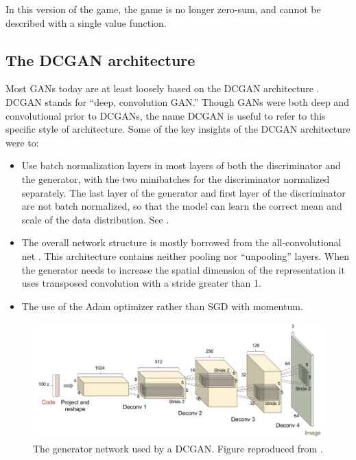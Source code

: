 In this version of the game, the game is no longer zero-sum, and cannot be described with a single
value function.

\subsection{The DCGAN architecture}

Most GANs today are at least loosely based on the DCGAN architecture \citep{radford2015unsupervised}.
DCGAN stands for ``deep, convolution GAN.'' Though GANs were both deep and convolutional prior to
DCGANs, the name DCGAN is useful to refer to this specific style of architecture.
Some of the key insights of the DCGAN architecture were to:
\begin{itemize}
  \item Use batch normalization layers in most layers of both the discriminator and the generator,
        with the two minibatches for the discriminator normalized separately.
        The last layer of the generator and first layer of the discriminator are not batch normalized,
        so that the model can learn the correct mean and scale of the data distribution.
        See .
  \item The overall network structure is mostly borrowed from the all-convolutional net \citep{Springenberg2015}.
        This architecture contains neither pooling nor ``unpooling'' layers.
        When the generator needs to increase the spatial dimension of the representation
        it uses transposed convolution with a stride greater than 1.
  \item The use of the Adam optimizer rather than SGD with momentum.
\end{itemize}

\begin{figure}
\centering
\includegraphics[width=\textwidth]{dcgan}
  \caption{The generator network used by a DCGAN. Figure reproduced from \citet{radford2015unsupervised}.}
\label{fig:dcgan}
\end{figure}


